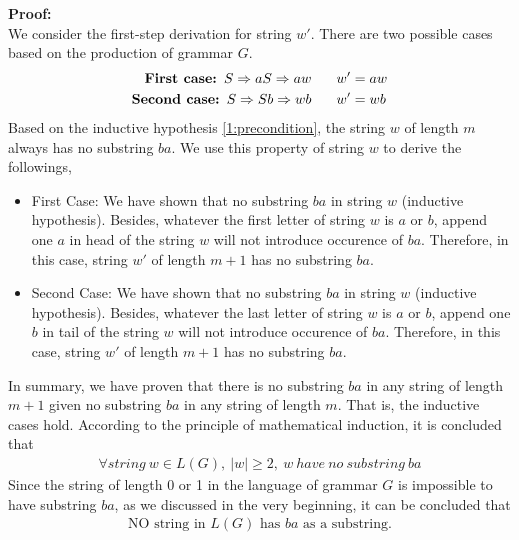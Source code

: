 \documentclass[11pt,a4paper]{article}
\newcommand{\htab}{\hspace*{0.63cm}}
\begin{document}
\htab \textbf{Proof:}\\
\htab We consider the first-step derivation for string $w'$. There are two possible cases based on the production of grammar $G$.
\begin{align}
    \textbf{First case: } S \Rightarrow aS \Rightarrow aw \htab w' &= aw \\
    \textbf{Second case: } S \Rightarrow Sb \Rightarrow wb \htab w' &= wb
    \end{align}
\htab Based on the inductive hypothesis \eqref{1:precondition}, the string $w$ of length $m$ always has no substring $ba$. We use this property of string $w$ to derive the followings,
        \begin{itemize}
    \item{First Case: We have shown that no substring $ba$ in string $w$ (inductive hypothesis). Besides, whatever the first letter of string $w$ is $a$ or $b$, append one $a$ in head of the string $w$ will not introduce occurence of $ba$. Therefore, in this case, string $w'$ of length $m+1$ has no substring $ba$.}
    \item{Second Case: We have shown that no substring $ba$ in string $w$ (inductive hypothesis). Besides, whatever the last letter of string $w$ is $a$ or $b$, append one $b$ in tail of the string $w$ will not introduce occurence of $ba$. Therefore, in this case, string $w'$ of length $m+1$ has no substring $ba$.}
        \end{itemize}
\htab In summary, we have proven that there is no substring $ba$ in any string of length $m+1$ given no substring $ba$ in any string of length $m$. That is, the inductive cases hold. According to the principle of mathematical induction, it is concluded that
\begin{align}
    \forall string\ w \in L(G),\ |w| \geq 2,\ w\ have\ no\ substring\ ba
\end{align}
\htab Since the string of length 0 or 1 in the language of grammar $G$ is impossible to have substring $ba$, as we discussed in the very beginning, it can be concluded that
\begin{align}
    \text{NO string in $L(G)$ has $ba$ as a substring.}
    \end{align}
\newpage
\newcommand{\Lone}{L_{1}}
\newcommand{\Ltwo}{L_{2}}
\newcommand{\Ltwob}{\overline{L_{2}} }
\newcommand{\ws}{w^{*}}
\newcommand{\wsp}{w^{*'}}
\end{document}
